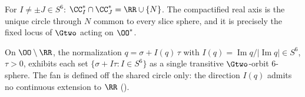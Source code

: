 
\begin{lemma}\label{lem:great-circle}
For $I \ne \pm J \in S^6$: $\CC_I^* \cap \CC_J^* = \RR \cup \{N\}$. The
compactified real axis is the unique circle through $N$ common to every slice
sphere, and it is precisely the fixed locus of $\Gtwo$ acting on $\OO^*$.
\end{lemma}

\begin{lemma}\label{lem:fan}
On $\OO \setminus \RR$, the normalization $q = \sigma + I(q)\,\tau$ with
$I(q) = \operatorname{Im} q / |\operatorname{Im} q| \in S^6$, $\tau > 0$,
exhibits each set $\{\sigma + I\tau : I \in S^6\}$ as a single transitive
$\Gtwo$-orbit $6$-sphere. The fan is defined off the shared circle only: the
direction $I(q)$ admits no continuous extension to $\RR$
\textup{(\cite[Rem.~2.1]{GPVwind})}.
\end{lemma}

